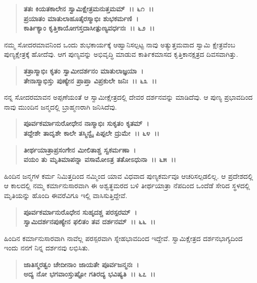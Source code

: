 \begin{verse}
\textbf{ತತಃ ಕಿಯತಕಾಲೇನ ಸ್ವಾಮಿಕ್ಷೇತ್ರಮನುತ್ತಮಮ್~।। ೬೧~।।}\\\textbf{ಪ್ರಯಾತಂ ಮಾತುಲಾಹೂತೈರಸ್ಮಾಭಿಃ ಶುಭಕರ್ಮಣಿ~। }\\\textbf{ಕಾರ್ತಿಕ್ಯಾಂ ಕೃತ್ತಿಕಾಯೋಗಸ್ತದಾಸೀತ್ಪುಣ್ಯವರ್ಧನಃ~।। ೬೨~।।}
\end{verse}

ನಮ್ಮ ಸೋದರಮಾವನಿಂದ ಒಂದು ಶುಭಕಾರ್ಯಕ್ಕೆ ಆಹ್ವಾನಿಸಲ್ಪಟ್ಟ ನಾವು ಅತ್ಯುತ್ತಮವಾದ ಸ್ವಾಮಿ ಕ್ಷೇತ್ರವೆಂಬ ಪುಣ್ಯಕ್ಷೇತ್ರಕ್ಕೆ ಹೋದೆವು. ಆಗ ಪುಣ್ಯವನ್ನು ಅಭಿವೃದ್ಧಿ ಮಾಡುವ ಕಾತಿ೯ಕಮಾಸದ ಕೃತ್ತಿಕಾನಕ್ಷತ್ರದ ದಿವಸವಾಗಿತ್ತು.

\begin{verse}
\textbf{ತತ್ರಾಸ್ಮಾಭಿಃ ಕೃತಂ ಸ್ವಾಮೀದರ್ಶನಂ ಮಾತುಲಾಜ್ಞಯಾ~।}\\\textbf{ತೇನಾಸ್ಮಾಭಿಸ್ತು ಪುಣ್ಯೇನ ಪ್ರಾಪ್ತಾ ವಿಪ್ರಕುಲೇ ಜನಿಃ~।। ೬೩~।।}
\end{verse}

ನನ್ನ ಸೋದರಮಾವನ ಅಪ್ಪಣೆಯಂತೆ ಆ ಸ್ವಾಮೀಕ್ಷೇತ್ರದಲ್ಲಿ ದೇವರ ದರ್ಶನವನ್ನು ಮಾಡಿದೆವು. ಆ ಪುಣ್ಯ ಪ್ರಭಾವದಿಂದ ನಾವು ಮುಂದಿನ ಜನ್ಮದಲ್ಲಿ ಬ್ರಾಹ್ಮಣರಾಗಿ ಜನಿಸಿದೆವು.

\begin{verse}
\textbf{ಪೂರ್ವಕರ್ಮಾನುರೋಧೇನ ನಾಸ್ಮಾಭಿಃ ಸುಕೃತಂ ಕೃತಮ್~।}\\\textbf{ತದ್ದೇಶೇ ತಾದೃಶೇ ಕಾಲೇ ತಸ್ಮಿನ್ವೈ ಪಿಪ್ಪಲೇ ದ್ರುಮೇ~।। ೬೪~।। }
\end{verse}

\begin{verse}
\textbf{ತೀರ್ಥಯಾತ್ರಾಪ್ರಸಂಗೇನ ಮೀಲಿತಾಶ್ಚ ಸ್ವಕರ್ಮಣಾ~।}\\\textbf{ವಯಂ ತು ಮೃತಿಮಾಪನ್ನಾ ವಸಾಮೋಽತ್ರ ತತೋಽಧುನಾ~।। ೬೫~।।}
\end{verse}

ಹಿಂದಿನ ಜನ್ಮಗಳ ಕರ್ಮ ನಿಮಿತ್ತದಿಂದ ನಮ್ಮಿಂದ ಯಾವ ವಿಧವಾದ ಪುಣ್ಯಕರ್ಮವೂ ಆಚರಿಸಲ್ಪಡಲಿಲ್ಲ. ಆ ಪ್ರದೇಶದಲ್ಲಿ ಆ ಕಾಲದಲ್ಲಿ ನಮ್ಮ ಕರ್ಮಾನುಸಾರವಾಗಿ ಈ ಅಶ್ವತ್ಥಮರದ ಬಳಿ ತೀರ್ಥಯಾತ್ರಾ ನೆಪದಿಂದ ಒಂದೆಡೆ ಸೇರಿದ ಸ್ಥಳದಲ್ಲಿ ಮೃತಿಯನ್ನು ಹೊಂದಿ ಈವರೆವಿಗೂ ಇಲ್ಲಿ ವಾಸಿಸುತ್ತಿದ್ದೇವೆ.

\begin{verse}
\textbf{ಪೂರ್ವಕರ್ಮಾನುರೊಧೇನ ಸುಹೃದಶ್ಚ ಪರಸ್ಪರಮ್~।}\\\textbf{ಸ್ವಾಮಿದರ್ಶನಪುಣ್ಯೇನ ಫಲಿತಂ ತವ ದರ್ಶನಮ್~।। ೬೬~।।}
\end{verse}

ಹಿಂದಿನ ಕರ್ಮಾನುಸಾರವಾಗಿ ನಾವೆಲ್ಲ ಪರಸ್ಪರವಾಗಿ ಸ್ನೇಹಭಾವದಿಂದ ಇದ್ದೇವೆ. ಸ್ವಾಮಿಕ್ಷೇತ್ರದ ದರ್ಶನಭಾಗ್ಯದಿಂದ ಇಂದು ನನಗೆ ನಿನ್ನ ದರ್ಶನವು ಲಭಿಸಿತು.

\begin{verse}
\textbf{ಜಾತಿಸ್ಮರತ್ವಂ ಚೇದೀನಾಂ ಜಾಯತೇ ಪೂರ್ವಜನ್ಮನಃ~।}\\\textbf{ಅದ್ಯ ನೋ ಭಗವಾಂಸ್ತುಷ್ಟೋ ಗತಿರದ್ಯ ಭವಿಷ್ಯತಿ~।। ೬೭~।।}
\end{verse}

